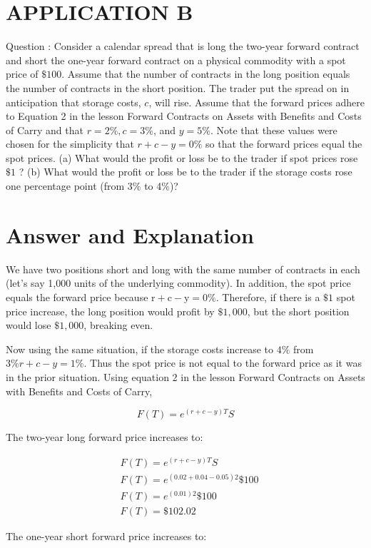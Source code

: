 \documentclass[11pt]{article}
\begin{document}
\section*{APPLICATION B}
Question : Consider a calendar spread that is long the two-year forward contract and short the one-year forward contract on a physical commodity with a spot price of $\$ 100$. Assume that the number of contracts in the long position equals the number of contracts in the short position. The trader put the spread on in anticipation that storage costs, $c$, will rise. Assume that the forward prices adhere to Equation 2 in the lesson Forward Contracts on Assets with Benefits and Costs of Carry and that $r=2 \%, c=3 \%$, and $y=5 \%$. Note that these values were chosen for the simplicity that $r+c-y=0 \%$ so that the forward prices equal the spot prices. (a) What would the profit or loss be to the trader if spot prices rose $\$ 1$ ? (b) What would the profit or loss be to the trader if the storage costs rose one percentage point (from $3 \%$ to 4\%)?

\section*{Answer and Explanation}
We have two positions short and long with the same number of contracts in each (let's say 1,000 units of the underlying commodity). In addition, the spot price equals the forward price because $\mathrm{r}+\mathrm{c}-\mathrm{y}=0 \%$. Therefore, if there is a $\$ 1$ spot price increase, the long position would profit by $\$ 1,000$, but the short position would lose $\$ 1,000$, breaking even.

Now using the same situation, if the storage costs increase to $4 \%$ from $3 \% r+c-y=1 \%$. Thus the spot price is not equal to the forward price as it was in the prior situation. Using equation 2 in the lesson Forward Contracts on Assets with Benefits and Costs of Carry,

$$
F(T)=e^{(r+c-y) T} S
$$

The two-year long forward price increases to:

$$
\begin{aligned}
& F(T)=e^{(r+c-y) T} S \\
& F(T)=e^{(0.02+0.04-0.05) 2} \$ 100 \\
& F(T)=e^{(0.01) 2} \$ 100 \\
& F(T)=\$ 102.02
\end{aligned}
$$

The one-year short forward price increases to:
\end{document}
